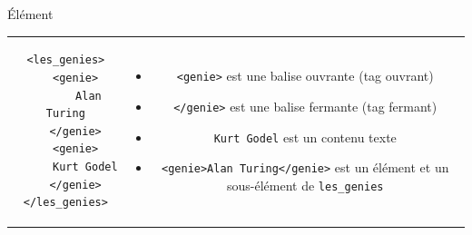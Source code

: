 \begin{frame}{\'El\'ement}
\lstset{numbers=left, numberstyle=\tiny, stepnumber=1}
\begin{tabular}{cc}
\begin{minipage}{0.3\textwidth}
\begin{lstlisting}
<les_genies>
   <genie>
       Alan Turing
   </genie>
   <genie>
      Kurt Godel
   </genie>
</les_genies>
\end{lstlisting}
\end{minipage}
&
\begin{minipage}{0.6\textwidth}
\begin{footnotesize}
 \begin{itemize}
\item \verb?<genie>? est une balise ouvrante (tag ouvrant) 

\item   \verb?</genie>? est une balise fermante (tag fermant) 

\item  \verb?Kurt Godel? est un contenu texte 

\item \verb?<genie>Alan Turing</genie>? est un \'el\'ement et un sous-\'el\'ement de \verb?les_genies?
 \end{itemize}
\end{footnotesize}
\end{minipage}
\end{tabular}

\framebreak


\end{frame}
